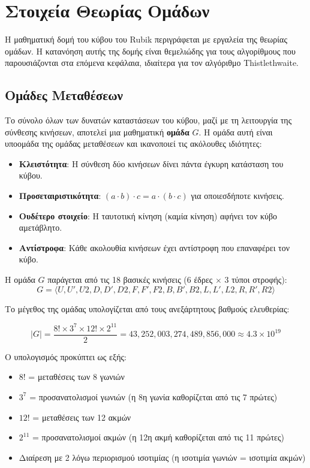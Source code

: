 \section{Στοιχεία Θεωρίας Ομάδων}
\label{sec:bg_group_theory}

Η μαθηματική δομή του κύβου του Rubik περιγράφεται με εργαλεία της θεωρίας ομάδων. Η κατανόηση αυτής της δομής είναι θεμελιώδης για τους αλγορίθμους που παρουσιάζονται στα επόμενα κεφάλαια, ιδιαίτερα για τον αλγόριθμο Thistlethwaite.

\subsection{Ομάδες Μεταθέσεων}
\label{subsec:permutation_groups}

Το σύνολο όλων των δυνατών καταστάσεων του κύβου, μαζί με τη λειτουργία της σύνθεσης κινήσεων, αποτελεί μια μαθηματική \textbf{ομάδα} $G$. Η ομάδα αυτή είναι υποομάδα της ομάδας μεταθέσεων και ικανοποιεί τις ακόλουθες ιδιότητες:

\begin{itemize}
    \item \textbf{Κλειστότητα}: Η σύνθεση δύο κινήσεων δίνει πάντα έγκυρη κατάσταση του κύβου.
    \item \textbf{Προσεταιριστικότητα}: $(a \cdot b) \cdot c = a \cdot (b \cdot c)$ για οποιεσδήποτε κινήσεις.
    \item \textbf{Ουδέτερο στοιχείο}: Η ταυτοτική κίνηση (καμία κίνηση) αφήνει τον κύβο αμετάβλητο.
    \item \textbf{Αντίστροφα}: Κάθε ακολουθία κινήσεων έχει αντίστροφη που επαναφέρει τον κύβο.
\end{itemize}

Η ομάδα $G$ παράγεται από τις 18 βασικές κινήσεις (6 έδρες $\times$ 3 τύποι στροφής):
\begin{equation}
    G = \langle U, U', U2, D, D', D2, F, F', F2, B, B', B2, L, L', L2, R, R', R2 \rangle
\end{equation}

Το μέγεθος της ομάδας υπολογίζεται από τους ανεξάρτητους βαθμούς ελευθερίας:

\begin{equation}
    |G| = \frac{8! \times 3^7 \times 12! \times 2^{11}}{2} = 43{,}252{,}003{,}274{,}489{,}856{,}000 \approx 4.3 \times 10^{19}
    \label{eq:group_size}
\end{equation}

Ο υπολογισμός προκύπτει ως εξής:
\begin{itemize}
    \item $8!$ = μεταθέσεις των 8 γωνιών
    \item $3^7$ = προσανατολισμοί γωνιών (η 8η γωνία καθορίζεται από τις 7 πρώτες)
    \item $12!$ = μεταθέσεις των 12 ακμών
    \item $2^{11}$ = προσανατολισμοί ακμών (η 12η ακμή καθορίζεται από τις 11 πρώτες)
    \item Διαίρεση με 2 λόγω περιορισμού ισοτιμίας (η ισοτιμία γωνιών = ισοτιμία ακμών)
\end{itemize}

